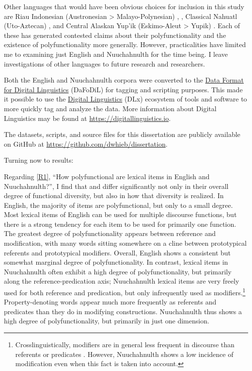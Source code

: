 Other languages that would have been obvious choices for inclusion in this study are Riau Indonesian (Austronesian > Malayo-Polynesian) \parencite{Gil1994},  \parencites{EvansOsada2005}{HengeveldRijkhoff2005}, Classical Nahuatl (Uto-Aztecan) \parencites{Launey1994}{Launey2004}, and Central Alaskan Yup'ik (Eskimo-Aleut > Yupik) \parencites{Thalbitzer1922}{Sadock1999}{Mithun2017}. Each of these has generated contested claims about their polyfunctionality and the existence of polyfunctionality more generally. However, practicalities have limited me to examining just English and Nuuchahnulth for the time being. I leave investigations of other languages to future research and researchers.

Both the English and Nuuchahnulth corpora were converted to the \href{https://format.digitallinguistics.io}{Data Format for Digital Linguistics} (DaFoDiL)  for tagging and scripting purposes. This made it possible to use the \href{https://digitallinguistics.io}{Digital Linguistics} (DLx) ecosystem of tools and software to more quickly tag and analyze the data. More information about Digital Linguistics may be found at \url{https://digitallinguistics.io}.

The datasets, scripts, and source files for this dissertation are publicly available on GitHub at \url{https://github.com/dwhieb/dissertation}.

Turning now to results:

Regarding \ref{R1}, \enquote{How polyfunctional are lexical items in English and Nuuchahnulth?}, I find that  and  differ significantly not only in their overall degree of functional diversity, but also in how that diversity is realized. In English, the majority of items are polyfunctional, but only to a small degree. Most lexical items of English can be used for multiple discourse functions, but there is a strong tendency for each item to be used for primarily one function. The greatest degree of polyfunctionality appears between reference and modification, with many words sitting somewhere on a cline between prototypical referents and prototypical modifiers. Overall, English shows a consistent but somewhat marginal degree of polyfunctionality. In contrast, lexical items in Nuuchahnulth often exhibit a high degree of polyfunctionality, but primarily along the reference-predication axis; Nuuchahnulth lexical items are very freely used for both reference and predication, but only infrequently used as modifiers.\footnote{Crosslinguistically, modifiers are in general less frequent in discourse than referents or predicates \parencite[§3.3.2]{Croft1991}. However, Nuuchahnulth shows a low incidence of modification even when this fact is taken into account.} Property-denoting words appear much more frequently as referents and predicates than they do in modifying constructions. Nuuchahnulth thus shows a high degree of polyfunctionality, but primarily in just one dimension.

